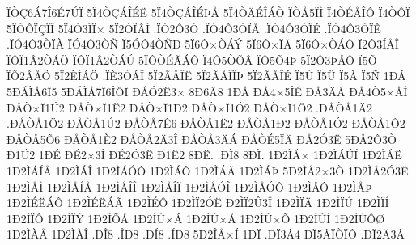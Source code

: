 {^^cf^^d2^^c76^^c17^^ce6^^c97^^da^^cf
5^^cf4^^d2^^c7^^c1^^ce^^c9^^cb
5^^cf4^^d2^^c7^^c1^^ce^^c9^^de^^c5
5^^cf4^^d2^^c4^^c9^^ce^^c1^^d2
^^cf^^d2^^c55^^cf^^cc
^^cf4^^d2^^c9^^c5^^ce^^d4
^^cf4^^d2^^d4^^cf
5^^cf^^d2^^d4^^cf^^c7^^cf^^ce
5^^cf4^^d33^^ce^^cf^^d7
5^^cf2^^d3^^cf^^c2^^cc
.^^cf^^d32^^d43^^d2
.^^cf^^d34^^d43^^d2^^cf^^c5
.^^cf^^d34^^d43^^d2^^cf^^c9
.^^cf^^d34^^d43^^d2^^cf^^ca
.^^cf^^d34^^d43^^d2^^cf^^c0
^^cf^^d34^^d43^^d2^^d1
^^cf5^^d3^^d44^^d2^^d1^^d0
5^^cf6^^d4^^d7^^d2^^c1^^dd
5^^cf6^^d4^^d7^^cf^^c4
5^^cf6^^d4^^d7^^d2^^c1^^d4
^^cf2^^d43^^cd^^c5^^ce
^^cf^^d4^^cf1^^c22^^d2^^c1^^d6
^^cf^^d4^^cf1^^c22^^d2^^c1^^da
5^^cf^^d4^^d2^^c9^^c3^^c1^^d4
^^cf4^^d45^^d2^^d5^^c2
^^cf^^d45^^d54^^de
5^^cf2^^d43^^de^^c5^^d4
^^cf5^^d5
^^cf^^d52^^c2^^c5^^d6
5^^cf2^^c8^^cc^^c1^^d6
.^^cf^^c83^^d2^^c1^^ce
5^^cf2^^c3^^c5^^ce^^cb
5^^cf2^^c3^^c5^^ce^^cf^^de
5^^cf2^^c3^^c5^^ce^^c9
^^cf5^^d9
^^cf5^^dc
^^cf5^^c0
^^cf5^^d1
1^^d0^^c1
5^^d0^^c1^^cc^^c56^^cf5
5^^d0^^c1^^cc^^c57^^cf6^^ce^^d4^^cf
^^d0^^c1^^d32^^cb3^^d7
8^^d06^^c28
1^^d0^^c5
^^d0^^c54^^d75^^ce^^c9
^^d0^^c53^^c4^^c1
^^d0^^c54^^d25^^d7^^c5^^ce
^^d0^^c5^^d2^^d7^^cf1^^da2
^^d0^^c5^^d2^^d7^^cf1^^cb2
^^d0^^c5^^d2^^d7^^cf1^^d02
^^d0^^c5^^d2^^d7^^cf1^^d32
^^d0^^c5^^d2^^d7^^cf1^^d42
.^^d0^^c5^^d2^^c51^^c42
.^^d0^^c5^^d2^^c51^^d62
^^d0^^c5^^d2^^c51^^da2
^^d0^^c5^^d2^^c57^^ca6
^^d0^^c5^^d2^^c51^^cb2
^^d0^^c5^^d2^^c51^^d02
^^d0^^c5^^d2^^c51^^d32
^^d0^^c5^^d2^^c51^^d42
^^d0^^c5^^d2^^c55^^d56
^^d0^^c5^^d2^^c51^^c82
^^d0^^c5^^d2^^c52^^c43^^ce
^^d0^^c5^^d2^^c53^^c4^^c1
^^d0^^c5^^d2^^c95^^cf^^c4
^^d0^^c52^^d33^^cb
5^^d0^^c52^^d43^^d2
^^d01^^da2
1^^d0^^c9
^^d0^^c92^^d73^^ce
^^d0^^c92^^d33^^cb
^^d01^^cb2
8^^d0^^cb.
.^^d0^^cc8
8^^d0^^cc.
1^^d02^^cc^^c1^^d7
1^^d02^^cc^^c1^^da^^cd
1^^d02^^cc^^c1^^cb
1^^d02^^cc^^c1^^cd^^c5
1^^d02^^cc^^c1^^ce
1^^d02^^cc^^c1^^d3^^d4
1^^d02^^cc^^c1^^d4
1^^d02^^cc^^c1^^c3
1^^d02^^cc^^c1^^de
5^^d02^^cc^^c52^^d73^^d2
1^^d02^^cc^^c52^^d33^^cb
1^^d02^^cc^^c5^^cc
1^^d02^^cc^^c5^^cd^^c5
1^^d02^^cc^^c5^^ce^^ce
1^^d02^^cc^^c5^^ce^^cf
1^^d02^^cc^^c5^^d3^^ce
1^^d02^^cc^^c5^^d3^^d4
1^^d02^^cc^^c5^^d4
1^^d02^^cc^^c5^^de
1^^d02^^cc^^c9^^cb^^c1^^d4
1^^d02^^cc^^c9^^cb^^c1^^c3
1^^d02^^cc^^c9^^d4
1^^d02^^cc^^cf2^^d3^^cb
^^d02^^cc^^cf2^^db3^^ce
1^^d02^^cc^^cf^^c4
1^^d02^^cc^^cf^^da
1^^d02^^cc^^cf^^cd
1^^d02^^cc^^cf^^d4
1^^d02^^cc^^cf^^dd
1^^d02^^cc^^d5^^c1
1^^d02^^cc^^d9^^d7^^c1
1^^d02^^cc^^d9^^d7^^c5
1^^d02^^cc^^d9^^d7^^d5
1^^d02^^cc^^d9^^cc
1^^d02^^cc^^d9^^d4^^d8
1^^d02^^cc^^c0^^c5
1^^d02^^cc^^c0^^ce
.^^d0^^ce8
.^^ce^^d08
.^^d0^^cd8
.^^cd^^d08
5^^d02^^ce^^c5^^d7^^cd
1^^d0^^cf
.^^d0^^cf3^^c24
^^d0^^cf5^^c2^^cf^^d2^^cf^^d4
.^^d0^^cf2^^c43^^c2
}

